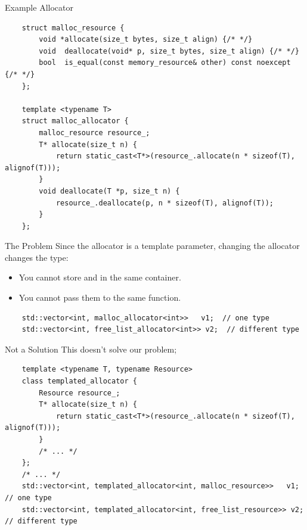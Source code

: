 \begin{frame}[fragile]{Example Allocator}
  \begin{verbatim}
    struct malloc_resource {
        void *allocate(size_t bytes, size_t align) {/* */}
        void  deallocate(void* p, size_t bytes, size_t align) {/* */}
        bool  is_equal(const memory_resource& other) const noexcept {/* */}
    };

    template <typename T>
    struct malloc_allocator {
        malloc_resource resource_;
        T* allocate(size_t n) {
            return static_cast<T*>(resource_.allocate(n * sizeof(T), alignof(T)));
        }
        void deallocate(T *p, size_t n) {
            resource_.deallocate(p, n * sizeof(T), alignof(T));
        }
    };
  \end{verbatim}
\end{frame}

\begin{frame}[fragile]{The Problem}
  Since the allocator is a template parameter, changing the allocator changes the type:
  \begin{itemize}
    \item You cannot store  and  in the same container.
    \item You cannot pass them to the same function.
  \end{itemize}
  \begin{verbatim}
    std::vector<int, malloc_allocator<int>>   v1;  // one type
    std::vector<int, free_list_allocator<int>> v2;  // different type
  \end{verbatim}
  
\end{frame}

\begin{frame}[fragile]{Not a Solution}
  This doesn't solve our problem;
  \begin{verbatim}
    template <typename T, typename Resource>
    class templated_allocator {
        Resource resource_;
        T* allocate(size_t n) {
            return static_cast<T*>(resource_.allocate(n * sizeof(T), alignof(T)));
        }
        /* ... */
    };
    /* ... */
    std::vector<int, templated_allocator<int, malloc_resource>>   v1;   // one type
    std::vector<int, templated_allocator<int, free_list_resource>> v2;  // different type
  \end{verbatim}
\end{frame}

